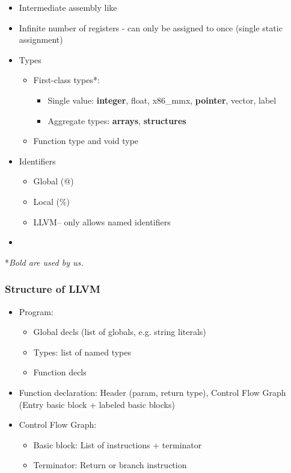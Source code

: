 \begin{itemize}
    \item Intermediate assembly like
    \item Infinite number of registers - can only be assigned to once (single static assignment)
    \item Types
    \begin{itemize}
        \item First-class types*: 
        \begin{itemize}
            \item Single value: \textbf{integer}, float, x86\_mmx, \textbf{pointer}, vector, label
            \item Aggregate types: \textbf{arrays}, \textbf{structures}
        \end{itemize}
        \item Function type and void type
    \end{itemize}
    \item Identifiers
    \begin{itemize}
        \item Global (@)
        \item Local (\%)
        \item LLVM-- only allows named identifiers
    \end{itemize}
    \item 
\end{itemize}

*\textit{Bold are used by us.}\\

\subsubsection{Structure of LLVM}

\begin{itemize}
    \item Program:
    \begin{itemize}
        \item Global decls (list of globals, e.g. string literals)
        \item Types: list of named types
        \item Function decls
    \end{itemize}
    \item Function declaration: Header (param, return type), Control Flow Graph (Entry basic block + labeled basic blocks)
    \item Control Flow Graph:
    \begin{itemize}
        \item Basic block: List of instructions + terminator
        \item Terminator: Return or branch instruction
    \end{itemize}
\end{itemize}